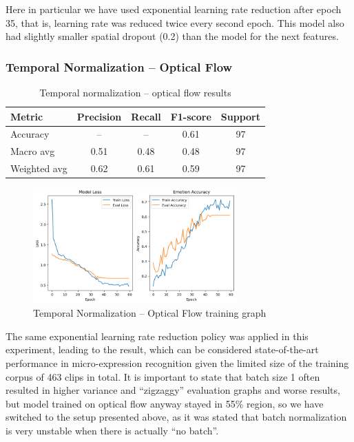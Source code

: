 \documentclass{article}
\begin{document}
Here in particular we have used exponential learning rate reduction after epoch 35, that is, learning rate was reduced twice every second epoch. This model also had slightly smaller spatial dropout (0.2) than the model for the next features.

\subsubsection{Temporal Normalization – Optical Flow}

\begin{table}[H]
\centering
\caption{Temporal normalization – optical flow results}
\begin{tabular}{|l|c|c|c|c|}
\hline
\textbf{Metric} & \textbf{Precision} & \textbf{Recall} & \textbf{F1-score} & \textbf{Support} \\
\hline
Accuracy       & --   & --   & 0.61 & 97 \\
Macro avg      & 0.51 & 0.48 & 0.48 & 97 \\
Weighted avg   & 0.62 & 0.61 & 0.59 & 97 \\
\hline
\end{tabular}
\label{tab:table11}
\end{table}

\begin{figure}[H]
  \begin{center}
    \includegraphics*[width=0.7\textwidth]{Figures/Picture15.png}
  \end{center}
  \caption{Temporal Normalization – Optical Flow training graph}
  \label{fig:fig15}
\end{figure}

The same exponential learning rate reduction policy was applied in this experiment, leading to the result, which can be considered state-of-the-art performance in micro-expression recognition given the limited size of the training corpus of 463 clips in total. It is important to state that batch size 1 often resulted in higher variance and “zigzaggy” evaluation graphs and worse results, but model trained on optical flow anyway stayed in 55\% region, so we have switched to the setup presented above, as it was stated that batch normalization is very unstable when there is actually “no batch”.
\end{document}
